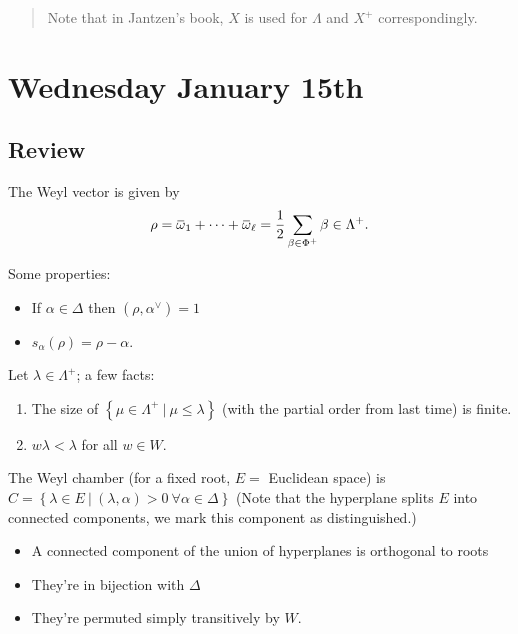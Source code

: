 \documentclass[11pt]{scrartcl}
\theoremstyle{definition}
\theoremstyle{theorem}
\theoremstyle{proof}
\theoremstyle{definition}
\theoremstyle{break}
\theoremstyle{problem}
\providecommand{\tightlist}{%
  \setlength{\itemsep}{0pt}\setlength{\parskip}{0pt}}
\newcommand{\dual}[0]{^\vee}
\newcommand{\suchthat}[0]{{~\mathrel{\Big|}~}}
\newcommand{\theset}[1]{\left\{{#1}\right\}}
\renewcommand{\bar}[1]{\mkern 1.5mu\overline{\mkern-1.5mu#1\mkern-1.5mu}\mkern 1.5mu}
\begin{document}
\begin{quote}
Note that in Jantzen's book, \(X\) is used for \(\Lambda\) and \(X^+\)
correspondingly.
\end{quote}

\hypertarget{wednesday-january-15th}{%
\section{Wednesday January 15th}\label{wednesday-january-15th}}

\hypertarget{review}{%
\subsection{Review}\label{review}}

The Weyl vector is given by
\begin{align*}
\rho = \bar \omega_1 + \cdots + \bar \omega_\ell = \frac 1 2 \sum_{\beta \in \Phi^+} \beta \in \Lambda^+
.\end{align*}

Some properties:

\begin{itemize}
\tightlist
\item
  If \(\alpha \in \Delta\) then \((\rho, \alpha\dual) = 1\)
\item
  \(s_\alpha(\rho) = \rho - \alpha\).
\end{itemize}

Let \(\lambda \in \Lambda^+\); a few facts:

\begin{enumerate}
\def\labelenumi{\arabic{enumi}.}
\tightlist
\item
  The size of \(\theset{\mu\in \Lambda^+ \suchthat \mu \leq \lambda}\)
  (with the partial order from last time) is finite.
\item
  \(w\lambda < \lambda\) for all \(w\in W\).
\end{enumerate}

The Weyl chamber (for a fixed root, \(E =\) Euclidean space) is
\(C = \theset{\lambda \in E \suchthat (\lambda, \alpha) > 0 ~ \forall \alpha\in\Delta}\)
(Note that the hyperplane splits \(E\) into connected components, we
mark this component as distinguished.)

\begin{itemize}
\tightlist
\item
  A connected component of the union of hyperplanes is orthogonal to
  roots
\item
  They're in bijection with \(\Delta\)
\item
  They're permuted simply transitively by \(W\).
\end{itemize}
\end{document}
